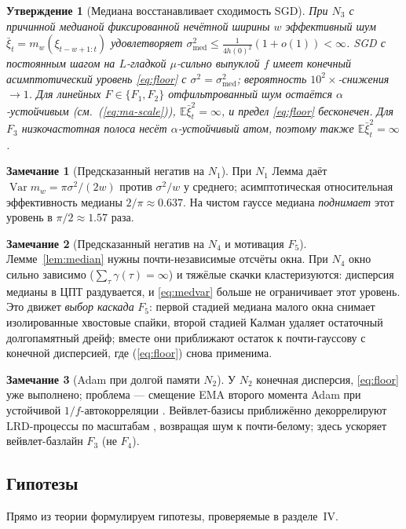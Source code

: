 \documentclass[conference]{IEEEtran}
\theoremstyle{plain}
\newtheorem{proposition}{Утверждение}
\theoremstyle{definition}
\newtheorem{remark}{Замечание}
\newcommand{\E}{\mathbb{E}}
\DeclareMathOperator{\Var}{Var}
\begin{document}
\begin{proposition}[Медиана восстанавливает сходимость SGD]
\label{prop:rescue}
При $N_3$ с причинной медианой фиксированной нечётной ширины $w$
эффективный шум $\bar\xi_t=m_w(\xi_{t-w+1:t})$ удовлетворяет
$\sigma_{\mathrm{med}}^2\le\tfrac{1}{4 h(0)^2}(1+o(1))<\infty$.
SGD с постоянным шагом на $L$-гладкой $\mu$-сильно выпуклой $f$ имеет
конечный асимптотический уровень \eqref{eq:floor} с $\sigma^2=\sigma_{\mathrm{med}}^2$;
вероятность $10^2\times$-снижения $\to1$. Для линейных $F\in\{F_1,F_2\}$
отфильтрованный шум остаётся $\alpha$-устойчивым (см.~(\ref{eq:ma-scale})),
$\E\bar\xi_t^2=\infty$, и предел \eqref{eq:floor} бесконечен. Для $F_3$ низкочастотная
полоса несёт $\alpha$-устойчивый атом, поэтому также
$\E\bar\xi_t^2=\infty$.
\end{proposition}

\begin{remark}[Предсказанный негатив на $N_1$]\label{rem:n1}
При $N_1$ Лемма даёт $\Var m_w=\pi\sigma^2/(2w)$ против $\sigma^2/w$ у
среднего; асимптотическая относительная эффективность медианы
$2/\pi\approx0.637$. На чистом гауссе медиана \emph{поднимает} этот уровень в
$\pi/2\approx1.57$ раза.
\end{remark}

\begin{remark}[Предсказанный негатив на $N_4$ и мотивация $F_5$]
\label{rem:n4}
Лемме~\ref{lem:median} нужны почти-независимые отсчёты окна. При $N_4$
окно сильно зависимо ($\sum_\tau\gamma(\tau)=\infty$) и тяжёлые скачки
кластеризуются: дисперсия медианы в ЦПТ раздувается, и
\eqref{eq:medvar} больше не ограничивает этот уровень. Это движет \emph{выбор
каскада} $F_5$: первой стадией медиана малого окна снимает
изолированные хвостовые спайки, второй стадией Калман удаляет
остаточный долгопамятный дрейф; вместе они приближают остаток к
почти-гауссову с конечной дисперсией, где (\ref{eq:floor}) снова
применима.
\end{remark}

\begin{remark}[Adam при долгой памяти $N_2$]\label{rem:n2}
У $N_2$ конечная дисперсия, \eqref{eq:floor} уже выполнено; проблема ---
смещение EMA второго момента Adam при устойчивой $1/f$-автокорреляции
\cite{defossez2022adam}. Вейвлет-базисы приближённо декоррелируют
LRD-процессы по масштабам \cite{percival2000wavelet}, возвращая шум к
почти-белому; здесь ускоряет вейвлет-базлайн $F_3$ (не $F_4$).
\end{remark}

\subsection{Гипотезы}
Прямо из теории формулируем гипотезы, проверяемые в разделе~IV.
\end{document}
